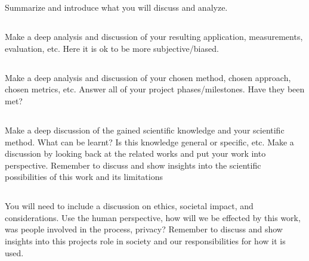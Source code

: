 \section{}\label{sec:discussion}
Summarize and introduce what you will discuss and analyze.

\subsection{}\label{subsec:discussion_analysis}
Make a deep analysis and discussion of your resulting application, measurements,
evaluation, etc. Here it is ok to be more subjective/biased.

\subsection{}\label{subsec:project_method_discussion}
Make a deep analysis and discussion of your chosen method, chosen approach,
chosen metrics, etc. Answer all of your project phases/milestones. Have they
been met?

\subsection{}\label{subsec:scientific_discussion}
Make a deep discussion of the gained scientific knowledge and your scientific
method. What can be learnt? Is this knowledge general or specific, etc. Make a
discussion by looking back at the related works and put your work into
perspective. Remember to discuss and show insights into the scientific
possibilities of this work and its limitations

\subsection{}\label{subsec:ethical_discussions}
You will need to include a discussion on ethics, societal impact, and
considerations. Use the human perspective, how will we be effected by this work,
was people involved in the process, privacy? Remember to discuss and show
insights into this projects role in society and our responsibilities for how it
is used.
